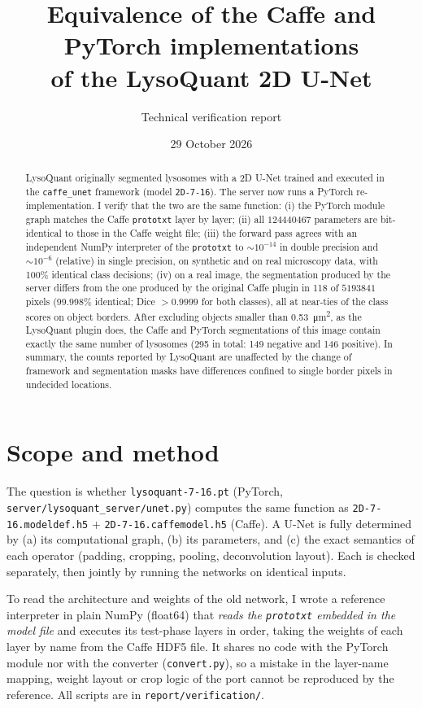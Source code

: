 \documentclass[11pt,a4paper]{article}
\title{Equivalence of the Caffe and PyTorch implementations\\of the LysoQuant 2D U-Net}
\author{Technical verification report}
\date{29 October 2026}
\begin{document}
\maketitle

\begin{abstract}
\noindent LysoQuant originally segmented lysosomes with a 2D U-Net trained and executed in the \texttt{caffe\_unet} framework (model \texttt{2D-7-16}). The server now runs a PyTorch re-implementation. I verify that the two are the same function: (i) the PyTorch module graph matches the Caffe \texttt{prototxt} layer by layer; (ii) all $\num[scientific-notation=false,round-mode=none]{124440467}$ parameters are bit-identical to those in the Caffe weight file; (iii) the forward pass agrees with an independent NumPy interpreter of the \texttt{prototxt} to $\sim10^{-14}$ in double precision and $\sim10^{-6}$ (relative) in single precision, on synthetic and on real microscopy data, with 100\% identical class decisions; (iv) on a real image, the segmentation produced by the server differs from the one produced by the original Caffe plugin in 118 of $\num[scientific-notation=false,round-mode=none]{5193841}$ pixels (99.998\% identical; Dice $>0.9999$ for both classes), all at near-ties of the class scores on object borders. After excluding objects smaller than \SI{0.53}{\micro m\squared}, as the LysoQuant plugin does, the Caffe and PyTorch segmentations of this image contain exactly the same number of lysosomes (295 in total: 149 negative and 146 positive). In summary, the counts reported by LysoQuant are unaffected by the change of framework and segmentation masks have differences confined to single border pixels in undecided locations.
\end{abstract}

\section{Scope and method}
The question is whether \texttt{lysoquant-7-16.pt} (PyTorch, \texttt{server/lysoquant\_server/unet.py}) computes the same function as \texttt{2D-7-16.modeldef.h5} + \texttt{2D-7-16.caffemodel.h5} (Caffe). A U-Net is fully determined by (a) its computational graph, (b) its parameters, and (c) the exact semantics of each operator (padding, cropping, pooling, deconvolution layout). Each is checked separately, then jointly by running the networks on identical inputs.

To read the architecture and weights of the old network, I wrote a reference interpreter in plain NumPy (float64) that \emph{reads the \texttt{prototxt} embedded in the model file} and executes its test-phase layers in order, taking the weights of each layer by name from the Caffe HDF5 file. It shares no code with the PyTorch module nor with the converter (\texttt{convert.py}), so a mistake in the layer-name mapping, weight layout or crop logic of the port cannot be reproduced by the reference. All scripts are in \texttt{report/verification/}.
\end{document}
